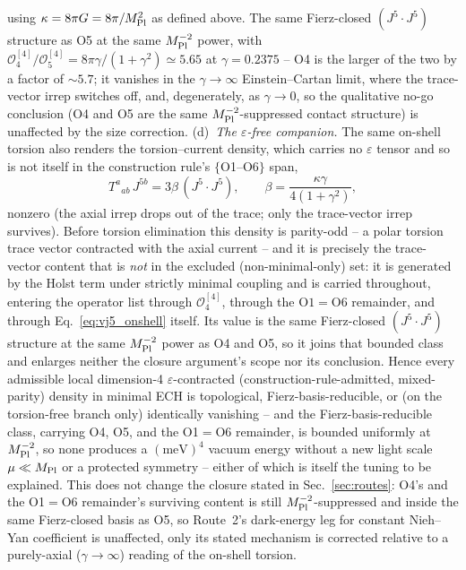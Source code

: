 \documentclass[aps,prd,twocolumn,superscriptaddress,preprintnumbers,nofootinbib,longbibliography,floatfix]{revtex4-2}
\newcommand{\MPl}{M_{\rm Pl}}
\begin{document}
using $\kappa=8\pi G=8\pi/\MPl^2$ as defined above. The same Fierz-closed
$(J^5\!\cdot\!J^5)$
structure as O5 at the same $\MPl^{-2}$ power, with
$\mathcal O_4^{[4]}/\mathcal O_5^{[4]}=8\pi\gamma/(1+\gamma^2)\simeq5.65$
at $\gamma=0.2375$ -- O4 is the larger of the two by a factor of
$\sim\!5.7$; it vanishes in the $\gamma\to\infty$ Einstein--Cartan limit,
where the trace-vector irrep switches off, and, degenerately, as
$\gamma\to0$, so the qualitative no-go conclusion
(O4 and O5 are the same $\MPl^{-2}$-suppressed contact structure) is
unaffected by the size correction.
(d)~\emph{The $\varepsilon$-free companion.} The same on-shell torsion
also renders the torsion--current density, which carries no
$\varepsilon$ tensor and so is not itself in the construction rule's
$\{$O1--O6$\}$ span,
\begin{equation}\label{eq:vj5_onshell}
T^a{}_{ab}\,J^{5b}=3\beta\,(J^5\!\cdot\!J^5),
\qquad\beta=\frac{\kappa\gamma}{4(1+\gamma^2)},
\end{equation}
nonzero (the axial irrep drops out of the trace; only the trace-vector
irrep survives). Before torsion elimination this density is parity-odd
-- a polar torsion trace vector contracted with the axial current -- and
it is precisely the trace-vector content that is \emph{not} in the
excluded (non-minimal-only) set: it is generated by the Holst term
under strictly minimal coupling and is carried throughout, entering the
operator list through $\mathcal O_4^{[4]}$, through the
$\mathrm{O1}=\mathrm{O6}$ remainder, and through
Eq.~\eqref{eq:vj5_onshell} itself. Its value is the same Fierz-closed
$(J^5\!\cdot\!J^5)$ structure at the same $\MPl^{-2}$ power as O4 and O5,
so it joins that bounded class and enlarges neither the closure
argument's scope nor its conclusion. Hence every admissible local
dimension-4 $\varepsilon$-contracted (construction-rule-admitted,
mixed-parity) density in minimal ECH is topological,
Fierz-basis-reducible, or (on the torsion-free branch only) identically
vanishing -- and the Fierz-basis-reducible class, carrying O4, O5, and
the O1$=$O6 remainder, is bounded uniformly at $\MPl^{-2}$, so none
produces a $(\text{meV})^4$ vacuum energy without a new light scale
$\mu\ll\MPl$ or a protected symmetry -- either of which is itself the
tuning to be explained. This does not change the closure stated in
Sec.~\ref{sec:routes}: O4's and the O1$=$O6 remainder's surviving content
is still $\MPl^{-2}$-suppressed and inside the same Fierz-closed basis as
O5, so Route~2's dark-energy leg for constant Nieh--Yan coefficient is
unaffected, only its stated mechanism is corrected relative to a
purely-axial ($\gamma\to\infty$) reading of the on-shell torsion.
\end{document}
